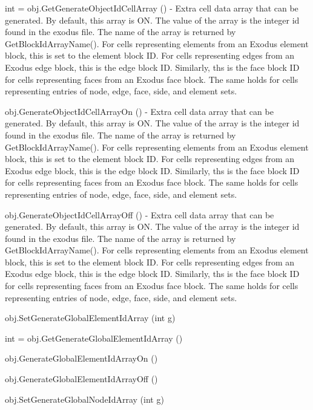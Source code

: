 \begin{DoxyItemize}
\item {\ttfamily int = obj.\-Get\-Generate\-Object\-Id\-Cell\-Array ()} -\/ Extra cell data array that can be generated. By default, this array is O\-N. The value of the array is the integer id found in the exodus file. The name of the array is returned by Get\-Block\-Id\-Array\-Name(). For cells representing elements from an Exodus element block, this is set to the element block I\-D. For cells representing edges from an Exodus edge block, this is the edge block I\-D. Similarly, ths is the face block I\-D for cells representing faces from an Exodus face block. The same holds for cells representing entries of node, edge, face, side, and element sets.  
\item {\ttfamily obj.\-Generate\-Object\-Id\-Cell\-Array\-On ()} -\/ Extra cell data array that can be generated. By default, this array is O\-N. The value of the array is the integer id found in the exodus file. The name of the array is returned by Get\-Block\-Id\-Array\-Name(). For cells representing elements from an Exodus element block, this is set to the element block I\-D. For cells representing edges from an Exodus edge block, this is the edge block I\-D. Similarly, ths is the face block I\-D for cells representing faces from an Exodus face block. The same holds for cells representing entries of node, edge, face, side, and element sets.  
\item {\ttfamily obj.\-Generate\-Object\-Id\-Cell\-Array\-Off ()} -\/ Extra cell data array that can be generated. By default, this array is O\-N. The value of the array is the integer id found in the exodus file. The name of the array is returned by Get\-Block\-Id\-Array\-Name(). For cells representing elements from an Exodus element block, this is set to the element block I\-D. For cells representing edges from an Exodus edge block, this is the edge block I\-D. Similarly, ths is the face block I\-D for cells representing faces from an Exodus face block. The same holds for cells representing entries of node, edge, face, side, and element sets.  
\item {\ttfamily obj.\-Set\-Generate\-Global\-Element\-Id\-Array (int g)}  
\item {\ttfamily int = obj.\-Get\-Generate\-Global\-Element\-Id\-Array ()}  
\item {\ttfamily obj.\-Generate\-Global\-Element\-Id\-Array\-On ()}  
\item {\ttfamily obj.\-Generate\-Global\-Element\-Id\-Array\-Off ()}  
\item {\ttfamily obj.\-Set\-Generate\-Global\-Node\-Id\-Array (int g)}  

\end{DoxyItemize}
